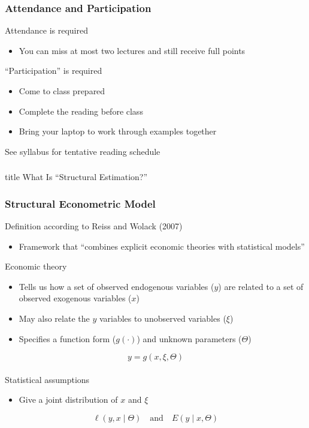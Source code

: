 \documentclass{beamer}\usepackage[]{graphicx}\usepackage[]{color}
\begin{document}
\begin{frame}\frametitle{Attendance and Participation}
    Attendance is required
    \begin{itemize}
        \item You can miss at most two lectures and still receive full points
    \end{itemize}
    \vspace{3ex}
    ``Participation'' is required
    \begin{itemize}
        \item Come to class prepared
        \item Complete the reading before class
        \item Bring your laptop to work through examples together
    \end{itemize}
    \vspace{3ex}
    See syllabus for tentative reading schedule
\end{frame}

\begin{frame}\frametitle{}
    \vfill
    \centering
    \begin{beamercolorbox}[center]{title}
        \Large What Is ``Structural Estimation?''
    \end{beamercolorbox}
    \vfill
\end{frame}

\begin{frame}\frametitle{Structural Econometric Model}
    Definition according to Reiss and Wolack (2007)
    \begin{itemize}
        \item Framework that ``combines explicit economic theories with statistical models''
    \end{itemize}
    \vspace{1ex}
    Economic theory
    \begin{itemize}
        \item Tells us how a set of observed endogenous variables ($y$) are related to a set of observed exogenous variables ($x$)
        \item May also relate the $y$ variables to unobserved variables ($\xi$)
        \item Specifies a function form ($g(\cdot)$) and unknown parameters ($\Theta$)
    \end{itemize}
    \vspace{1ex}
    $$y = g(x, \xi, \Theta)$$ \\
    \vspace{1ex}
    Statistical assumptions
    \begin{itemize}
        \item Give a joint distribution of $x$ and $\xi$
    \end{itemize}
    \vspace{1ex}
    $$\ell(y, x \mid \Theta) \quad \text{and} \quad E(y \mid x, \Theta)$$
\end{frame}
\end{document}

